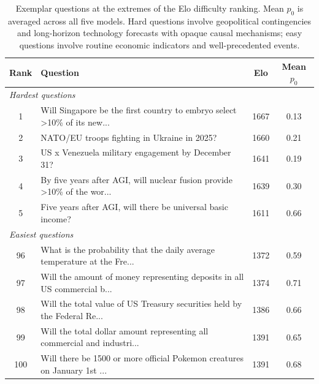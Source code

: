 \begin{table}[t]
\centering
\small
\begin{tabular}{clcc}
\toprule
\textbf{Rank} & \textbf{Question} & \textbf{Elo} & \textbf{Mean $p_0$} \\
\midrule
\multicolumn{4}{l}{\textit{Hardest questions}} \\
1 & Will Singapore be the first country to embryo select >10\% of its new... & 1667 & 0.13 \\
2 & NATO/EU troops fighting in Ukraine in 2025? & 1660 & 0.21 \\
3 & US x Venezuela military engagement by December 31? & 1641 & 0.19 \\
4 & By five years after AGI, will nuclear fusion provide >10\% of the wor... & 1639 & 0.30 \\
5 & Five years after AGI, will there be universal basic income? & 1611 & 0.66 \\
\midrule
\multicolumn{4}{l}{\textit{Easiest questions}} \\
96 & What is the probability that the daily average temperature at the Fre... & 1372 & 0.59 \\
97 & Will the amount of money representing deposits in all US commercial b... & 1374 & 0.71 \\
98 & Will the total value of US Treasury securities held by the Federal Re... & 1386 & 0.66 \\
99 & Will the total dollar amount representing all commercial and industri... & 1391 & 0.65 \\
100 & Will there be 1500 or more official Pokemon creatures on January 1st ... & 1391 & 0.68 \\
\bottomrule
\end{tabular}
\caption{Exemplar questions at the extremes of the Elo difficulty ranking. Mean $p_0$ is averaged across all five models. Hard questions involve geopolitical contingencies and long-horizon technology forecasts with opaque causal mechanisms; easy questions involve routine economic indicators and well-precedented events.}
\label{tab:elo_exemplars}
\end{table}
